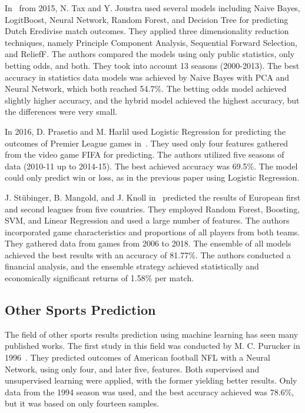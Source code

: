 \documentclass[thesis=M,english]{FITthesis}[2019/12/23]
\begin{document}
In~\cite{Dutch_football} from 2015, N. Tax and Y. Joustra used several models including Naive Bayes, LogitBoost, Neural Network, Random Forest, and Decision Tree for predicting Dutch Eredivise match outcomes. They applied three dimensionality reduction techniques, namely Principle Component Analysis, Sequential Forward Selection, and ReliefF. The authors compared the models using only public statistics, only betting odds, and both. They took into account 13 seasons (2000-2013). The best accuracy in statistics data models was achieved by Naive Bayes with PCA and Neural Network, which both reached 54.7\%. The betting odds model achieved slightly higher accuracy, and the hybrid model achieved the highest accuracy, but the differences were very small.

In 2016, D. Prasetio and M. Harlil used Logistic Regression for predicting the outcomes of Premier League games in~\cite{BPL_logistic_regression}. They used only four features gathered from the video game FIFA for predicting. The authors utilized five seasons of data (2010-11 up to 2014-15). The best achieved accuracy was 69.5\%. The model could only predict win or loss, as in the previous paper using Logistic Regression.

J. Stübinger, B. Mangold, and J. Knoll in~\cite{football_players} predicted the results of European first and second leagues from five countries. They employed Random Forest, Boosting, SVM, and Linear Regression and used a large number of features. The authors incorporated game characteristics and proportions of all players from both teams. They gathered data from games from 2006 to 2018. The ensemble of all models achieved the best results with an accuracy of 81.77\%. The authors conducted a financial analysis, and the ensemble strategy achieved statistically and economically significant returns of 1.58\% per match.

\subsection{Other Sports Prediction}
The field of other sports results prediction using machine learning has seen many published works. The first study in this field was conducted by M. C. Purucker in 1996~\cite{NFL_first_study}. They predicted outcomes of American football NFL with a Neural Network, using only four, and later five, features. Both supervised and unsupervised learning were applied, with the former yielding better results. Only data from the 1994 season was used, and the best accuracy achieved was 78.6\%, but it was based on only fourteen samples.
\end{document}
